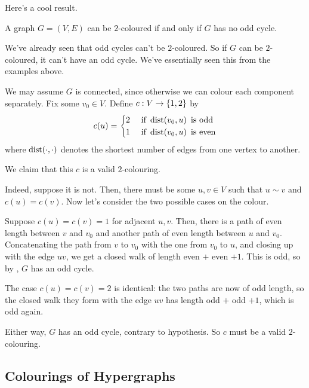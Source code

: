 Here's a cool result.

\begin{boxtheorem}
    A graph $G = (V, E)$ can be $2$-coloured if and only if $G$ has no odd cycle.
\end{boxtheorem}
\begin{iffproof}
    \onlyifdir We've already seen that odd cycles can't be $2$-coloured. So if $G$ can be $2$-coloured, it can't have an odd cycle. We've essentially seen this from the examples above.

    \ifdir We may assume $G$ is connected, since otherwise we can colour each component separately. Fix some $v_0 \in V$. Define $c : V \to \left\{ 1, 2 \right\}$ by
    \begin{align*}
        c(u) =
        \begin{cases}
            2 & \text{ if } \operatorname{dist}\!\left( v_0, u \right) \text{ is odd} \\
            1 & \text{ if } \operatorname{dist}\!\left( v_0, u \right) \text{ is even}
        \end{cases}
    \end{align*}
    where $\operatorname{dist}\!\left( \cdot, \cdot \right)$ denotes the shortest number of edges from one vertex to another.

    We claim that this $c$ is a valid $2$-colouring.

    Indeed, suppose it is not. Then, there must be some $u, v \in V$ such that $u \sim v$ and $c(u) = c(v)$. Now let's consider the two possible cases on the colour.

    Suppose $c(u) = c(v) = 1$ for adjacent $u, v$. Then, there is a path of even length between $v$ and $v_0$ and another path of even length between $u$ and $v_0$. Concatenating the path from $v$ to $v_0$ with the one from $v_0$ to $u$, and closing up with the edge $uv$, we get a closed walk of length even $+$ even $+ 1$. This is odd, so by , $G$ has an odd cycle.

    The case $c(u) = c(v) = 2$ is identical: the two paths are now of odd length, so the closed walk they form with the edge $uv$ has length odd $+$ odd $+ 1$, which is odd again.

    Either way, $G$ has an odd cycle, contrary to hypothesis. So $c$ must be a valid $2$-colouring.
\end{iffproof}

\subsection{Colourings of Hypergraphs}

